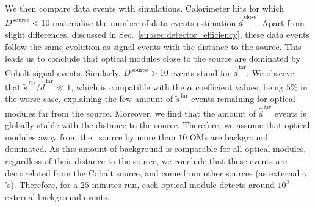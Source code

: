 We then compare data events with simulations.
Calorimeter hits for which $D^{\,\text{source}}<10$ materialise the number of data events estimation $\hat{d}^{\,\text{close}}$.
Apart from slight differences, discussed in Sec.~\ref{subsec:detector_efficiency}, these data events follow the same evolution as signal events with the distance to the source.
This leads us to conclude that optical modules close to the source are dominated by Cobalt signal events.
Similarly, $D^{\,\text{source}}>10$ events stand for $\hat{d}^{\,\text{far}}$.
We observe that $\tilde{s}^{\,\text{far}}/\hat{d}^{\,\text{far}} \ll 1$, which is compatible with the $\alpha$ coefficient values, being $5\%$ in the worse case, explaining the few amount of $\tilde{s}^{\,\text{far}}$ events remaining for optical modules far from the source.
Moreover, we find that the amount of $\hat{d}^{\,\text{far}}$ events is globally stable with the distance to the source.
Therefore, we assume that optical modules away from the \Co\ source by more than $10$ OMs are background dominated.
As this amount of background is comparable for all optical modules, regardless of their distance to the source, we conclude that these events are decorrelated from the Cobalt source, and come from other sources (as external $\gamma$'s).
Therefore, for a $25$ minutes run, each optical module detects around $10^{2}$ external background events.

